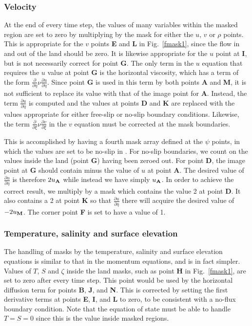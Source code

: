 \subsubsection{Velocity}
At the end of every time step, the values of many variables within the
masked region are set to zero by multiplying by the mask for either the
$u$, $v$ or $\rho$ points.  This is appropriate for the $v$ points {\bf
E} and {\bf L} in Fig.\ \ref{fmask1}, since the flow in and out of the
land should be zero.  It is likewise appropriate for the $u$ point at
{\bf I}, but is not necessarily correct for point {\bf G}.  The only
term in the $u$ equation that requires the $u$ value at point {\bf G}
is the horizontal viscosity, which has a term of the form
$\frac{\partial}{\partial \eta} \nu \frac{\partial u}{\partial \eta}$.
Since point {\bf G} is used in this term by both points {\bf A} and
{\bf M}, it is not sufficient to replace its value with that of the
image point for {\bf A}.  Instead, the term $\frac{\partial u}{\partial
\eta}$ is computed and the values at points {\bf D} and {\bf K} are
replaced with the values appropriate for either free-slip or no-slip
boundary conditions.  Likewise, the term $\frac{\partial}{\partial \xi}
\nu \frac{\partial v}{\partial \xi}$ in the $v$ equation must be corrected
at the mask boundaries.

This is accomplished by having a fourth mask array defined at the $\psi$
points, in which the values are set to be no-slip in .
For no-slip boundaries, we count on the values inside
the land (point {\bf G}) having been zeroed out.  For point {\bf D}, the
image point at {\bf G} should contain minus the value of $u$ at point
{\bf A}.  The desired value of $\frac{\partial u}{\partial \eta}$ is
therefore $2 u_{\bf A}$ while instead we have simply $u_{\bf A}$.
In order to achieve the correct result, we multiply by a mask which
contains the value 2 at point {\bf D}.  It also contains a 2 at point
{\bf K} so that $\frac{\partial u}{\partial \eta}$ there will acquire
the desired value of $-2 u_{\bf M}$. The corner point {\bf F} is set to
have a value of 1.

\subsubsection{Temperature, salinity and surface elevation}

The handling of masks by the temperature, salinity and surface
elevation equations is similar to that in the momentum equations, and
is in fact simpler.  Values of $T$, $S$ and $\zeta$ inside the land
masks, such as point {\bf H} in Fig.\ \ref{fmask1}, are set to zero
after every time step.  This point would be used by the horizontal
diffusion term for points {\bf B}, {\bf J}, and {\bf N}.  This is
corrected by setting the first derivative terms at points {\bf E}, {\bf
I}, and {\bf L} to zero, to be consistent with a no-flux boundary
condition.
Note that the equation of state must be able to handle $T = S = 0$
since this is the value inside masked regions.

